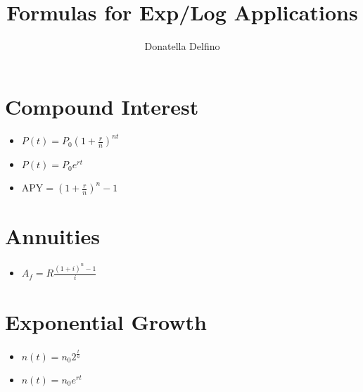 \documentclass{tufte-handout}
\title{Formulas for Exp/Log Applications}
\author[Donatella Delfino]{Donatella Delfino}
\begin{document}
\maketitle%



\section{Compound Interest}\label{sec:compoundinterest}
\begin{itemize}
\item $\displaystyle P(t)=P_0\left (1+\frac{r}{n}\right )^{nt}$
\item $\displaystyle P(t)=P_0e^{rt}$
\item $\displaystyle {\text{APY}}=\left (1+\frac{r}{n}\right )^n-1$
\end{itemize}
\section{Annuities}
\begin{itemize}
\item $\displaystyle A_f=R\frac{ (1+i)^n-1}{i}$
\end{itemize}
\section{Exponential Growth}
\begin{itemize}
\item $\displaystyle n(t)=n_0 2^{\frac{t}{a}}$
\item $\displaystyle n(t)=n_0 e^{rt}$
\end{itemize}
\end{document}
